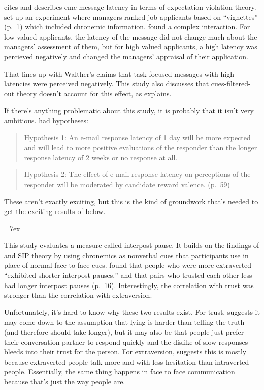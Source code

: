 \documentclass[
  stu]{apa7}
\begin{document}
\textcite{kalman11} cites \textcite{walther95} and describes cmc message
latency in terms of expectation violation theory. \textcite{kalman11}
set up an experiment where managers ranked job applicants based on
``vignettes'' (p.~1) which included chronemic information.
\textcite{kalman11} found a complex interaction. For low valued
applicants, the latency of the message did not change much about the
managers' assessment of them, but for high valued applicants, a high
latency was percieved negatively and changed the managers' appraisal of
their application.

That lines up with Walther's claims that task focused messages with high
latencies were perceived negatively. This study also discusses that
cues-filtered-out theory doesn't account for this effect, as
\textcite{walther95} explains.

If there's anything problematic about this study, it is probably that it
isn't very ambitious. \textcite{kalman11} had hypotheses:

\begin{quote}
Hypothesis 1: An e-mail response latency of 1 day will be more expected
and will lead to more positive evaluations of the responder than the
longer response latency of 2 weeks or no response at all.
\end{quote}

\begin{quote}
Hypothesis 2: The effect of e-mail response latency on perceptions of
the responder will be moderated by candidate reward valence. (p.~59)
\end{quote}

\noindent These aren't exactly exciting, but this is the kind of
groundwork that's needed to get the exciting results of
\textcite{kalman13} below.

\noindent \hangindent=7ex 

This study evaluates a measure called interpost pause. It builds on the
findings of \textcite{kalman11} and SIP theory by using chronemics as
nonverbal cues that participants use in place of normal face to face
cues. \textcite{kalman13} found that people who were more extraverted
``exhibited shorter interpost pauses,'' and that pairs who trusted each
other less had longer interpost pauses (p.~16). Interestingly, the
correlation with trust was stronger than the correlation with
extraversion.

Unfortunately, it's hard to know why these two results exist. For trust,
\textcite{kalman13} suggests it may come down to the assumption that
lying is harder than telling the truth (and therefore should take
longer), but it may also be that people just prefer their conversation
partner to respond quickly and the dislike of slow responses bleeds into
their trust for the person. For extraversion, \textcite{kalman13}
suggests this is mostly because extraverted people talk more and with
less hesitation than intraverted people. Essentially, the same thing
happens in face to face communication because that's just the way people
are.

\printbibliography
\end{document}
